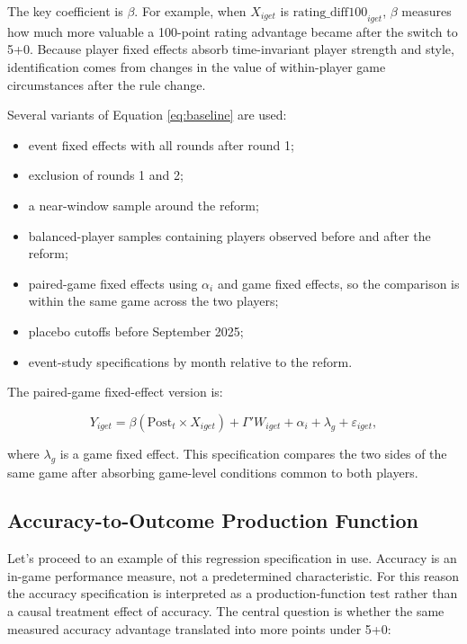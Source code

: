 The key coefficient is \(\beta\). For example, when \(X_{iget}\) is \(\text{rating\_diff100}_{iget}\), \(\beta\) measures how much more valuable a 100-point rating advantage became after the switch to 5+0. Because player fixed effects absorb time-invariant player strength and style, identification comes from changes in the value of within-player game circumstances after the rule change.

Several variants of Equation \eqref{eq:baseline} are used:

\begin{itemize}
    \item event fixed effects with all rounds after round 1;
    \item exclusion of rounds 1 and 2;
    \item a near-window sample around the reform;
    \item balanced-player samples containing players observed before and after the reform;
    \item paired-game fixed effects using \(\alpha_i\) and game fixed effects, so the comparison is within the same game across the two players;
    \item placebo cutoffs before September 2025;
    \item event-study specifications by month relative to the reform.
\end{itemize}

The paired-game fixed-effect version is:

\begin{equation}
\label{eq:gamefe}
Y_{iget}
= \beta \left(\text{Post}_{t} \times X_{iget}\right)
+ \Gamma' W_{iget}
+ \alpha_i
+ \lambda_g
+ \varepsilon_{iget},
\end{equation}

\noindent where \(\lambda_g\) is a game fixed effect. This specification compares the two sides of the same game after absorbing game-level conditions common to both players.

\subsection{Accuracy-to-Outcome Production Function}

Let's proceed to an example of this regression specification in use. Accuracy is an in-game performance measure, not a predetermined characteristic. For this reason the accuracy specification is interpreted as a production-function test rather than a causal treatment effect of accuracy. The central question is whether the same measured accuracy advantage translated into more points under 5+0:

